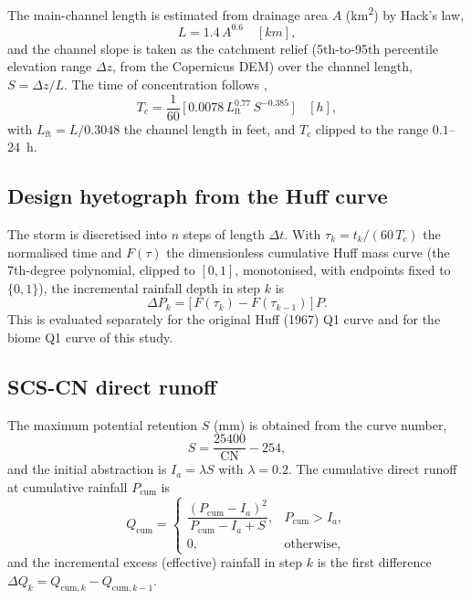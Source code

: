 \documentclass[11pt]{article}
\begin{document}
The main-channel length is estimated from drainage area $A$
(\si{km^2}) by Hack's law,
\begin{equation}
  L = 1.4\,A^{0.6}\quad[\si{km}],
  \label{eq:hack}
\end{equation}
and the channel slope is taken as the catchment relief (5th-to-95th
percentile elevation range $\Delta z$, from the Copernicus DEM) over the
channel length, $S = \Delta z / L$. The time of concentration follows
\citet{Kirpich1940},
\begin{equation}
  T_c = \frac{1}{60}\,\bigl[\,0.0078\,L_{\mathrm{ft}}^{0.77}\,S^{-0.385}\,\bigr]
  \quad[\si{h}],
  \label{eq:kirpich}
\end{equation}
with $L_{\mathrm{ft}} = L/0.3048$ the channel length in feet, and
$T_c$ clipped to the range $0.1$--$24$~h.

\subsection{Design hyetograph from the Huff curve}

The storm is discretised into $n$ steps of length $\Delta t$. With
$\tau_k = t_k/(60\,T_c)$ the normalised time and $F(\tau)$ the
dimensionless cumulative Huff mass curve (the 7th-degree polynomial,
clipped to $[0,1]$, monotonised, with endpoints fixed to $\{0,1\}$),
the incremental rainfall depth in step $k$ is
\begin{equation}
  \Delta P_k = \bigl[\,F(\tau_k) - F(\tau_{k-1})\,\bigr]\,P .
  \label{eq:hyeto}
\end{equation}
This is evaluated separately for the original Huff (1967) Q1 curve and
for the biome Q1 curve of this study.

\subsection{SCS-CN direct runoff}

The maximum potential retention $S$ (\si{mm}) is obtained from the
curve number,
\begin{equation}
  S = \frac{25400}{\mathrm{CN}} - 254 ,
  \label{eq:retention}
\end{equation}
and the initial abstraction is $I_a = \lambda S$ with $\lambda = 0.2$.
The cumulative direct runoff at cumulative rainfall $P_{\mathrm{cum}}$
is
\begin{equation}
  Q_{\mathrm{cum}} =
  \begin{cases}
    \dfrac{(P_{\mathrm{cum}} - I_a)^2}{P_{\mathrm{cum}} - I_a + S},
      & P_{\mathrm{cum}} > I_a,\\[8pt]
    0, & \text{otherwise,}
  \end{cases}
  \label{eq:scscn}
\end{equation}
and the incremental excess (effective) rainfall in step $k$ is the first
difference $\Delta Q_k = Q_{\mathrm{cum},k} - Q_{\mathrm{cum},k-1}$.
\end{document}

